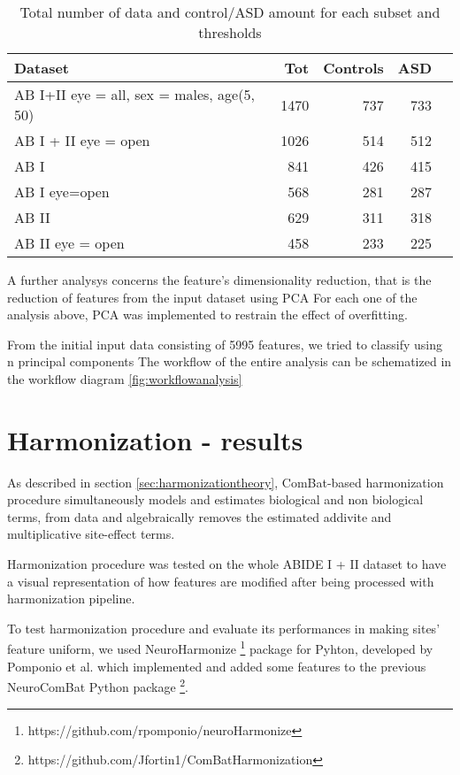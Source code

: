 \documentclass[10pt]{report}
\begin{document}
\begin{table}[!htp]\centering
\scriptsize
\begin{tabular}{lrrrr}\toprule
Dataset &Tot &Controls &ASD \\\midrule
AB I+II eye = all, sex = males, age(5, 50) &1470 &737 &733 \\
AB I + II eye = open &1026 &514 &512 \\
AB I &841 &426 &415 \\
AB I eye=open &568 &281 &287 \\
AB II &629 &311 &318 \\
AB II eye = open &458 &233 &225 \\
\bottomrule
\end{tabular}
\caption{Total number of data and control/ASD amount for each subset and thresholds}
\label{tab:controlasd_per_subset}
\end{table}


A further analysys concerns the feature's dimensionality reduction, that is the reduction of features from the input dataset using PCA
For each one of the analysis above, PCA was implemented to restrain the effect of overfitting.

From the initial input data consisting of 5995 features, we tried to classify using n principal components
The workflow of the entire analysis can be schematized in the workflow diagram \ref{fig:workflowanalysis}



\chapter{Harmonization - results}


As described in section \ref{sec:harmonizationtheory}, ComBat-based harmonization procedure simultaneously models and estimates biological and non biological terms, from data and algebraically removes the estimated addivite and multiplicative site-effect terms.

Harmonization procedure was tested on the whole ABIDE I + II dataset to have a visual representation of how features are modified after being processed with harmonization pipeline.

To test harmonization procedure and evaluate its performances in making sites' feature uniform, we used NeuroHarmonize \footnote{https://github.com/rpomponio/neuroHarmonize} package for Pyhton, developed by Pomponio et al. \cite{pomponio-2019} which implemented and added some features to the previous NeuroComBat Python package \footnote{https://github.com/Jfortin1/ComBatHarmonization}.
\end{document}
